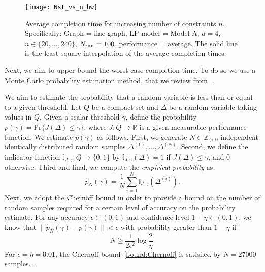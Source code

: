\documentclass[onecolumn,journal,letterpaper]{IEEEtran}
\renewcommand{\natural}{{\mathbb{N}}}
\renewcommand{\natural}{{\mathbb{Z}_{>0}}}
\newcommand{\real}{{\mathbb{R}}}
\newcommand{\subscr}[2]{{#1}_{\textup{#2}}}
\newcommand{\map}[3]{#1: #2 \rightarrow #3}
\newcommand\oprocendsymbol{\hbox{$\square$}}
\newcommand\oprocend{\relax\ifmmode\else\unskip\hfill\fi\oprocendsymbol}
\begin{document}
\begin{figure}[h]
\begin{center}
\texttt{[image: Nst\_vs\_n\_bw]}\caption{Average completion time for increasing number of constraints
    $n$. Specifically: Graph = line graph, LP model = Model A, $d=4$,
    $n\in\{20,\dots,240\}$, $\subscr{N}{run}=100$, performance =
    average. The solid line is the least-square interpolation of the
    average completion times.}
  \label{fig:Nst_vs_n_line}
\end{center}
\end{figure}

Next, we aim to upper bound the worst-case completion time. To do so we use
a Monte Carlo probability estimation method, that we review
from~\cite{RT-GC-FD:05}.

\begin{remark}\label{rem:probability-estimation-via-montecarlo}
  We aim to estimate the probability that a random variable is less than or
  equal to a given threshold. Let $Q$ be a compact set and $\Delta$ be a
  random variable taking values in $Q$. Given a scalar threshold $\gamma$,
  define the probability $p(\gamma) = \text{Pr}\{J(\Delta)\leq \gamma\}$,
  where $\map{J}{Q}{\real}$ is a given measurable performance function. We
  estimate $p(\gamma)$ as follows. First, we generate $N\in\natural$
  independent identically distributed random samples $\Delta^{(1)}, \ldots,
  \Delta^{(N)}$. Second, we define the indicator function
  $\map{\mathbb{I}_{J,\gamma}}{Q}{\{0,1\}}$ by
  $\mathbb{I}_{J,\gamma}(\Delta) = 1$ if $J(\Delta)\leq\gamma$, and $0$
  otherwise. Third and final, we compute the \emph{empirical probability}
  as
  \begin{equation*}
    \hat{p}_N(\gamma) = \frac{1}{N}\sum_{i=1}^N \mathbb{I}_{J,\gamma}(\Delta^{(i)}).
  \end{equation*}
  Next, we adopt the Chernoff bound in order to provide a bound on the
  number of random samples required for a certain level of accuracy on the
  probability estimate.  For any accuracy $\epsilon \in (0, 1)$ and
  confidence level $1-\eta \in (0, 1)$, we know that $\|\hat{p}_N(\gamma)
  - p(\gamma)\| < \epsilon$ with probability greater than $1-\eta$ if
  \begin{equation}
    \label{bound:Chernoff}
    N \geq \frac{1}{2\epsilon^2}\log\frac{2}{\eta}.
  \end{equation}
  For $\epsilon = \eta = 0.01$, the Chernoff bound~\eqref{bound:Chernoff}
  is satisfied by $N = 27000$ samples.  \oprocend
\end{remark}
\end{document}
